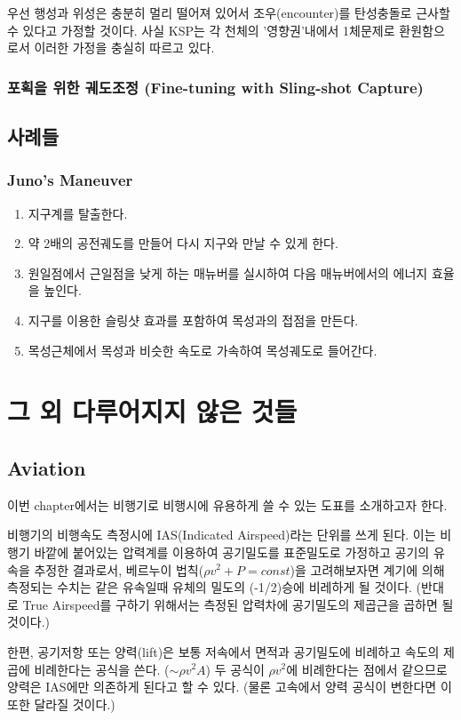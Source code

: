 \documentclass[9pt,twoside,openany]{amsbook}
\begin{document}
우선 행성과 위성은 충분히 멀리 떨어져 있어서 조우(encounter)를 탄성충돌로 근사할 수 있다고 가정할 것이다. 사실 KSP는 각 천체의 '영향권'내에서 1체문제로 환원함으로서 이러한 가정을 충실히 따르고 있다.
\section{포획을 위한 궤도조정 (Fine-tuning with Sling-shot Capture)}

\chapter{사례들}
\section{Juno's Maneuver}
\begin{enumerate}
\item 지구계를 탈출한다.
\item 약 2배의 공전궤도를 만들어 다시 지구와 만날 수 있게 한다.
\item 원일점에서 근일점을 낮게 하는 매뉴버를 실시하여 다음 매뉴버에서의 에너지 효율을 높인다.
\item 지구를 이용한 슬링샷 효과를 포함하여 목성과의 접점을 만든다.
\item 목성근체에서 목성과 비슷한 속도로 가속하여 목성궤도로 들어간다.
\end{enumerate}
\part{그 외 다루어지지 않은 것들}
\chapter{Aviation}
이번 chapter에서는 비행기로 비행시에 유용하게 쓸 수 있는 도표를 소개하고자 한다.

비행기의 비행속도 측정시에 IAS(Indicated Airspeed)라는 단위를 쓰게 된다. 
이는 비행기 바깥에 붙어있는 압력계를 이용하여 공기밀도를 표준밀도로 가정하고 공기의 유속을 추정한 결과로서, 베르누이 법칙($\rho v^2 + P = const$)을 고려해보자면 계기에 의해 측정되는 수치는 같은 유속일때 유체의 밀도의 (-1/2)승에 비레하게 될 것이다. (반대로 True Airspeed를 구하기 위해서는 측정된 압력차에 공기밀도의 제곱근을 곱하면 될 것이다.)

한편, 공기저항 또는 양력(lift)은 보통 저속에서 면적과 공기밀도에 비례하고 속도의 제곱에 비례한다는 공식을 쓴다. ($\sim \rho v^2 A$)
두 공식이 $\rho v^2$에 비례한다는 점에서 같으므로 양력은 IAS에만 의존하게 된다고 할 수 있다. (물론 고속에서 양력 공식이 변한다면 이 또한 달라질 것이다.)
\end{document}
